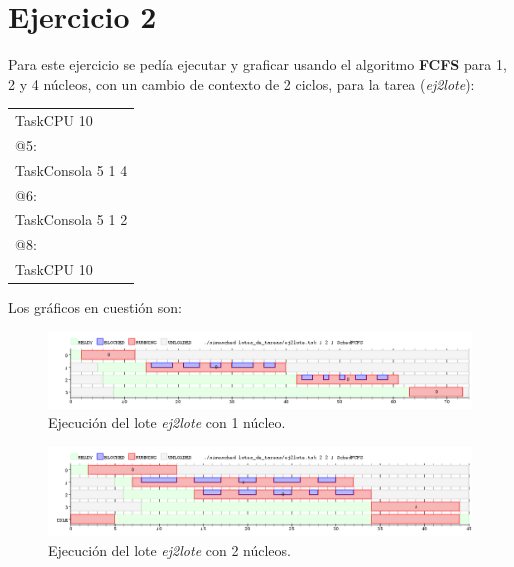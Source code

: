 \section{Ejercicio 2}

Para este ejercicio se pedía ejecutar y graficar usando el algoritmo \textbf{FCFS} para 1, 2 y 4 núcleos, con un cambio de contexto de 2 ciclos, para la tarea (\emph{ej2lote}): 

\begin{center}
	\begin{tabular}{|l|}
		\hline
		TaskCPU 10			\\
		@5:					\\
		TaskConsola 5 1 4	\\
		@6:					\\
		TaskConsola 5 1 2	\\
		@8:					\\
		TaskCPU 10			\\
		\hline
	\end{tabular}
\end{center}

Los gráficos en cuestión son:

\begin{figure}[!h]
	\begin{center}
		\includegraphics[width=500px]{imagenes/ej2_1.png}
		\caption{Ejecución del lote \emph{ej2lote} con 1 núcleo.}
		\label{fig:grafico_ej2_1}
	\end{center}
\end{figure}

\begin{figure}[!h]
	\begin{center}
		\includegraphics[width=500px]{imagenes/ej2_2.png}
		\caption{Ejecución del lote \emph{ej2lote} con 2 núcleos.}
		\label{fig:grafico_ej2_2}
	\end{center}
\end{figure}

